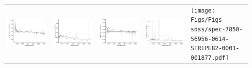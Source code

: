 \begin{center}
\begin{longtable}{l l l l l }
    \includegraphics[width=0.19\linewidth, clip]{Figs/Figs-sdss/spec-6782-56572-0334-STRIPE82-0059-014841.pdf} & \includegraphics[width=0.19\linewidth, clip]{Figs/Figs-sdss/spec-7820-56984-0072-STRIPE82-0065-043212.pdf} & \includegraphics[width=0.19\linewidth, clip]{Figs/Figs-sdss/spec-7822-57041-0034-STRIPE82-0061-046539.pdf} & \includegraphics[width=0.19\linewidth, clip]{Figs/Figs-sdss/spec-7822-57041-0278-STRIPE82-0061-047759.pdf} & \texttt{[image: Figs/Figs-sdss/spec-7850-56956-0614-STRIPE82-0001-001877.pdf]} \\

\end{longtable}
\end{center}
